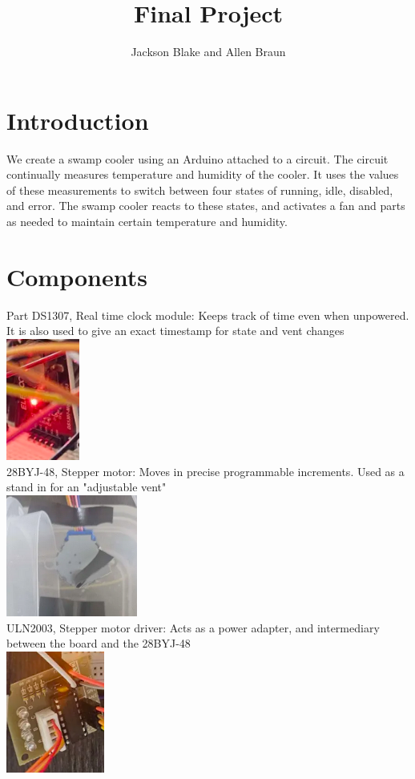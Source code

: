 \documentclass{article}
\title{Final Project}
\author{Jackson Blake and Allen Braun}
\begin{document}
\maketitle
\section{Introduction}
We create a swamp cooler using an Arduino attached to a circuit. The circuit continually measures temperature and humidity of the cooler. It uses the values of these measurements to switch between four states of running, idle, disabled, and error. The swamp cooler reacts to these states, and activates a fan and parts as needed to maintain certain temperature and humidity.\\
\section{Components}
Part DS1307, Real time clock module: Keeps track of time even when unpowered. It is also used to give an exact timestamp for state and vent changes\\
\includegraphics[height=40mm]{realtimeclock.png}\\
28BYJ-48, Stepper motor: Moves in precise programmable increments. Used as a stand in for an "adjustable vent"\\
\includegraphics[height=40mm]{steppermotor.png}\\
ULN2003, Stepper motor driver: Acts as a power adapter, and intermediary between the board and the 28BYJ-48\\
\includegraphics[height=40mm]{steppermotordriver.png}\\
\end{document}
